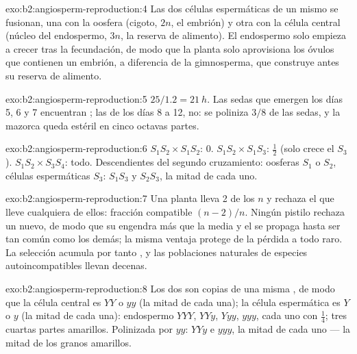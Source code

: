 \begin{solution}{exo:b2:angiosperm-reproduction:4}
Las dos células espermáticas de un mismo  se fusionan, una
con la oosfera (cigoto, $2n$, el embrión) y otra con la célula central
(núcleo del endospermo, $3n$, la reserva de alimento). El endospermo solo
empieza a crecer tras la fecundación, de modo que la planta solo
aprovisiona los óvulos que contienen un embrión, a diferencia de la
gimnosperma, que construye antes su reserva de alimento.
\end{solution}

\begin{solution}{exo:b2:angiosperm-reproduction:5}
$25/1.2 = \qty{21}{h}$. Las sedas que emergen los días 5, 6 y 7 encuentran
; las de los días 8 a 12, no: se poliniza $3/8$ de las sedas, y la
mazorca queda estéril en cinco octavas partes.
\end{solution}

\begin{solution}{exo:b2:angiosperm-reproduction:6}
$S_1S_2\times S_1S_2$: 0. $S_1S_2\times S_1S_3$: $\tfrac12$ (solo crece
el  $S_3$). $S_1S_2\times S_3S_4$: todo. Descendientes del segundo
cruzamiento: oosferas $S_1$ o $S_2$, células espermáticas $S_3$: $S_1S_3$
y $S_2S_3$, la mitad de cada uno.
\end{solution}

\begin{solution}{exo:b2:angiosperm-reproduction:7}
Una planta lleva 2 de los $n$  y rechaza el  que lleve
cualquiera de ellos: fracción compatible $(n - 2)/n$. Ningún pistilo
rechaza un  nuevo, de modo que su  engendra más  que la
media y el  se propaga hasta ser tan común como los demás; la misma
ventaja protege de la pérdida a todo  raro. La selección acumula
por tanto , y las poblaciones naturales de especies
autoincompatibles llevan decenas.
\end{solution}

\begin{solution}{exo:b2:angiosperm-reproduction:8}
Los dos  son copias de una misma , de modo que la
célula central es $YY$ o $yy$ (la mitad de cada una); la célula
espermática es $Y$ o $y$ (la mitad de cada una): endospermo $YYY$, $YYy$,
$Yyy$, $yyy$, cada uno con $\tfrac14$; tres cuartas partes amarillos.
Polinizada por $yy$: $YYy$ e $yyy$, la mitad de cada uno --- la mitad de
los granos amarillos.
\end{solution}

